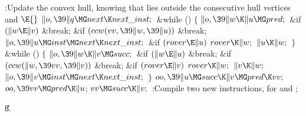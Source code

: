\B{}:Update the convex hull, knowing that  lies
outside the consecutive hull vertices  and \X${}\E{}$\6
$\|o,\39\|q\MG\\{next}\K\\{next\_inst};{}$\6
\&{while} ()\5
${}\{{}$\1\6
${}\|o,\39\|w\K\|u\MG\\{pred};{}$\6
\&{if} ${}(\|w\E\|v){}$\1\5
\&{break};\2\6
\&{if} ${}(\\{ccw}(\\{vv},\39\|w,\39\|u)){}$\1\5
\&{break};\2\6
${}\|o,\39\|u\MG\\{inst}\MG\\{next}\K\\{next\_inst};{}$\6
\&{if} ${}(\\{rover}\E\|u){}$\1\5
${}\\{rover}\K\|w;{}$\2\6
${}\|u\K\|w;{}$\6
\4${}\}{}$\2\6
\&{while} ()\5
${}\{{}$\1\6
${}\|o,\39\|w\K\|v\MG\\{succ};{}$\6
\&{if} ${}(\|w\E\|u){}$\1\5
\&{break};\2\6
\&{if} ${}(\\{ccw}(\|w,\39\\{vv},\39\|v)){}$\1\5
\&{break};\2\6
\&{if} ${}(\\{rover}\E\|v){}$\1\5
${}\\{rover}\K\|w;{}$\2\6
${}\|v\K\|w;{}$\6
${}\|o,\39\|v\MG\\{inst}\MG\\{next}\K\\{next\_inst};{}$\6
\4${}\}{}$\2\6
${}\\{oo},\39\|u\MG\\{succ}\K\|v\MG\\{pred}\K\\{vv};{}$\6
${}\\{oo},\39\\{vv}\MG\\{pred}\K\|u{}$;\5
${}\\{vv}\MG\\{succ}\K\|v;{}$\6
:Compile two new instructions, for  and \X;\par
\U8.\fi


